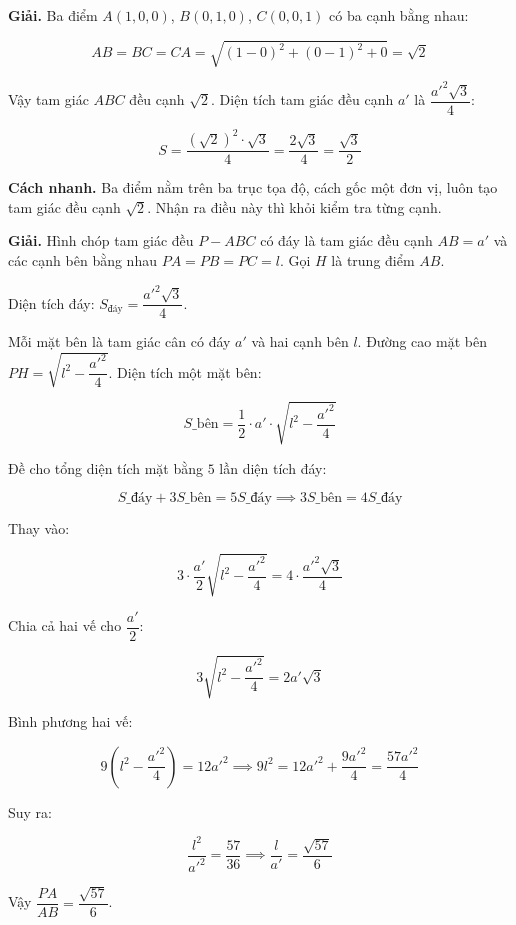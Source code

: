 \documentclass[11pt, a4paper]{article}
\begin{document}
\begin{dapan}[7 — Đáp án C]
\textbf{Giải.} Ba điểm $A(1,0,0)$, $B(0,1,0)$, $C(0,0,1)$ có ba cạnh bằng nhau:

$$AB = BC = CA = \sqrt{(1-0)^2 + (0-1)^2 + 0} = \sqrt{2}$$

Vậy tam giác $ABC$ đều cạnh $\sqrt{2}$. Diện tích tam giác đều cạnh $a'$ là $\dfrac{a'^2\sqrt{3}}{4}$:

$$S = \frac{(\sqrt{2})^2 \cdot \sqrt{3}}{4} = \frac{2\sqrt{3}}{4} = \frac{\sqrt{3}}{2}$$

\textbf{Cách nhanh.} Ba điểm nằm trên ba trục tọa độ, cách gốc một đơn vị, luôn tạo tam giác đều cạnh $\sqrt{2}$. Nhận ra điều này thì khỏi kiểm tra từng cạnh.
\end{dapan}

\begin{dapan}[8 — Đáp án D]
\textbf{Giải.} Hình chóp tam giác đều $P-ABC$ có đáy là tam giác đều cạnh $AB = a'$ và các cạnh bên bằng nhau $PA = PB = PC = l$. Gọi $H$ là trung điểm $AB$.

Diện tích đáy: $S_{\text{đáy}} = \dfrac{a'^2\sqrt{3}}{4}$.

Mỗi mặt bên là tam giác cân có đáy $a'$ và hai cạnh bên $l$. Đường cao mặt bên $PH = \sqrt{l^2 - \dfrac{a'^2}{4}}$. Diện tích một mặt bên:

$$S\_{\text{bên}} = \frac{1}{2} \cdot a' \cdot \sqrt{l^2 - \frac{a'^2}{4}}$$

Đề cho tổng diện tích mặt bằng $5$ lần diện tích đáy:

$$S\_{\text{đáy}} + 3S\_{\text{bên}} = 5S\_{\text{đáy}} \implies 3S\_{\text{bên}} = 4S\_{\text{đáy}}$$

Thay vào:

$$3 \cdot \frac{a'}{2}\sqrt{l^2 - \frac{a'^2}{4}} = 4 \cdot \frac{a'^2\sqrt{3}}{4}$$

Chia cả hai vế cho $\dfrac{a'}{2}$:

$$3\sqrt{l^2 - \frac{a'^2}{4}} = 2a'\sqrt{3}$$

Bình phương hai vế:

$$9\left(l^2 - \frac{a'^2}{4}\right) = 12a'^2 \implies 9l^2 = 12a'^2 + \frac{9a'^2}{4} = \frac{57a'^2}{4}$$

Suy ra:

$$\frac{l^2}{a'^2} = \frac{57}{36} \implies \frac{l}{a'} = \frac{\sqrt{57}}{6}$$

Vậy $\dfrac{PA}{AB} = \dfrac{\sqrt{57}}{6}$.
\end{dapan}
\end{document}
